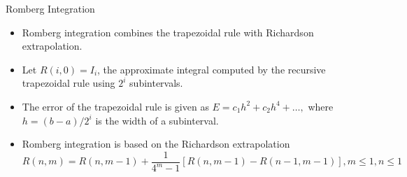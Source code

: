 \documentclass{beamer}
\newcommand{\beforeverb}{\footnotesize}
\newcommand{\afterverb}{\normalsize}
\begin{document}
\begin{frame}{Romberg Integration}
\begin{itemize}
\item Romberg integration combines the trapezoidal rule with Richardson extrapolation.
\item Let $R(i,0)=I_i$, the approximate integral computed by the recursive trapezoidal rule using $2^{i}$ subintervals.
\item The error of the trapezoidal rule is given as  $E=c_1h^2+c_2 h^4+\ldots,$ where $h=(b-a)/2^{i}$ is the width of a subinterval.
\item Romberg integration is based on the Richardson extrapolation
\beforeverb
\[
R(n,m)=R(n,m-1)+\frac{1}{4^m-1}[R(n,m-1)-R(n-1, m-1)], m\le1, n\le 1
\]
\afterverb
\end{itemize}
\end{frame}
\end{document}
